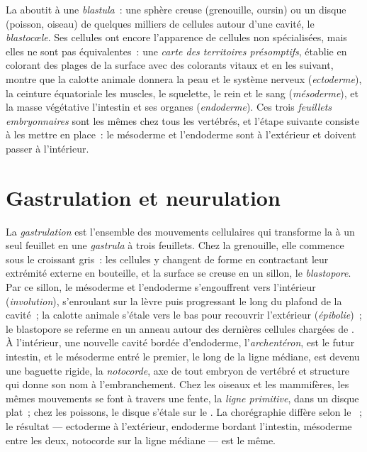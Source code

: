 \begin{definition}[Blastula]\label{def:b2:vertebrate-development:blastula}
La  aboutit à une \emph{blastula}~: une sphère creuse
(grenouille, oursin) ou un disque (poisson, oiseau) de quelques
milliers de cellules autour d'une cavité, le \emph{blastocœle}. Ses
cellules ont encore l'apparence de cellules non spécialisées, mais
elles ne sont pas équivalentes~: une \emph{carte des territoires
présomptifs}, établie en colorant des plages de la surface avec des
colorants vitaux et en les suivant, montre que la calotte animale
donnera la peau et le système nerveux (\emph{ectoderme}), la ceinture
équatoriale les muscles, le squelette, le rein et le sang
(\emph{mésoderme}), et la masse végétative l'intestin et ses organes
(\emph{endoderme}). Ces trois \emph{feuillets embryonnaires} sont les
mêmes chez tous les vertébrés, et l'étape suivante consiste à les mettre
en place~: le mésoderme et l'endoderme sont à l'extérieur et doivent
passer à l'intérieur.
\end{definition}

\section{Gastrulation et neurulation}

\begin{proposition}[La gastrulation]\label{prop:b2:vertebrate-development:gastrulation}
La \emph{gastrulation} est l'ensemble des mouvements cellulaires qui
transforme la  à un seul feuillet en une \emph{gastrula} à trois
feuillets. Chez la grenouille, elle commence sous le croissant gris~:
les cellules y changent de forme en contractant leur extrémité externe
en bouteille, et la surface se creuse en un sillon, le
\emph{blastopore}. Par ce sillon, le mésoderme et l'endoderme
s'engouffrent vers l'intérieur (\emph{involution}), s'enroulant sur la
lèvre puis progressant le long du plafond de la cavité~; la calotte
animale s'étale vers le bas pour recouvrir l'extérieur
(\emph{épibolie})~; le blastopore se referme en un anneau autour des
dernières cellules chargées de . À l'intérieur, une nouvelle
cavité bordée d'endoderme, l'\emph{archentéron}, est le futur intestin,
et le mésoderme entré le premier, le long de la ligne médiane, est
devenu une baguette rigide, la \emph{notocorde}, axe de tout embryon de
vertébré et structure qui donne son nom à l'embranchement. Chez les
oiseaux et les mammifères, les mêmes mouvements se font à travers une
fente, la \emph{ligne primitive}, dans un disque plat~; chez les
poissons, le disque s'étale sur le . La chorégraphie diffère
selon le ~; le résultat --- ectoderme à l'extérieur, endoderme
bordant l'intestin, mésoderme entre les deux, notocorde sur la ligne
médiane --- est le même.
\end{proposition}


